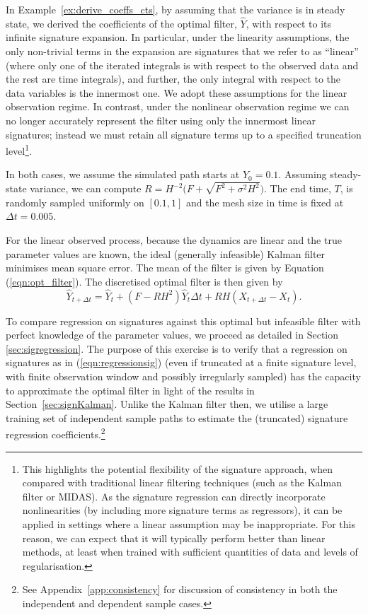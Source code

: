 \documentclass[a4paper, 12pt]{article}
\theoremstyle{remark}
\begin{document}
In Example~\ref{ex:derive_coeffs_cts}, by assuming that the variance is in steady state, we derived the coefficients of the optimal filter, \(\hat{Y}\), with respect to its infinite signature expansion. 
In particular, under the linearity assumptions, the only non-trivial terms in the expansion are signatures that we refer to as ``linear'' (where only one of the iterated integrals is with respect to the observed data and the rest are time integrals), and further, the only integral with respect to the data variables is the innermost one. We adopt these assumptions for the linear observation regime. In contrast, under the nonlinear observation regime we can no longer accurately represent the filter using only the innermost linear signatures; instead we must retain all signature terms up to a specified truncation level\footnote{This highlights the potential flexibility of the signature approach, when compared with traditional linear filtering techniques (such as the Kalman filter or MIDAS). As the signature regression can directly incorporate nonlinearities (by including more signature terms as regressors), it can be applied in settings where a linear assumption may be inappropriate. For this reason, we can expect that it will typically perform better than linear methods, at least when trained with sufficient quantities of data and levels of regularisation.}.

In both cases, we assume the simulated path starts at \(Y_0 = 0.1\). Assuming steady-state variance, we can compute \(R=H^{-2}\big(F+\sqrt{F^2+\sigma^2H^2}\big)\). The end time, \(T\), is randomly sampled uniformly on \([0.1,1]\) and the mesh size in time is fixed at \(\Delta t = 0.005\).

For the linear observed process, because the dynamics are linear and the true parameter values are known, the ideal (generally infeasible) Kalman filter minimises mean square error. The mean of the filter is given by Equation (\ref{eqn:opt_filter}). The discretised optimal filter is then given by 
\[\hat{Y}_{t+\Delta t} = \hat{Y}_t + (F-RH^2)\hat{Y}_t\Delta t+RH(X_{t+\Delta t}-X_t).\]

To compare regression on signatures against this optimal but infeasible filter with perfect knowledge of the parameter values, we proceed as detailed in Section \ref{sec:sigregression}. The purpose of this exercise is to verify that a regression on signatures as in (\ref{eqn:regressionsig}) (even if truncated at a finite signature level, with finite observation window and possibly irregularly sampled) has the capacity to approximate the optimal filter in light of the results in Section~\ref{sec:signKalman}. Unlike the Kalman filter then, we utilise a large training set of independent sample paths to estimate the (truncated) signature regression coefficients.\footnote{See Appendix~\ref{app:consistency} for discussion of consistency in both the independent and dependent sample cases.}
\end{document}
